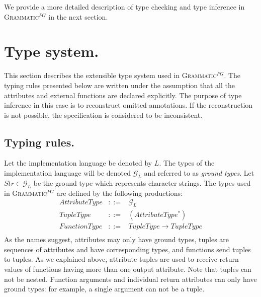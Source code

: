 \documentclass{informat} %
\newcommand{\ATF}{\textsc{Grammatic}$^{PG}$}
\begin{document}
We provide a more detailed description of type checking and type inference in \ATF{} in the next section.



\section{Type system.}\label{TypeSystem}

This section describes the extensible type system used in \ATF{}. The typing rules presented below are written under the assumption that all the attributes and external functions are declared explicitly. The purpose of type inference in this case is to reconstruct omitted annotations. If the reconstruction is not possible, the specification is considered to be inconsistent.

\subsection{Typing rules.}

\newcommand{\G}{ {\mathcal{G}_L} }
\renewcommand{\L}{L}
\newcommand{\eql}{\cong_\L}
\newcommand{\lel}{\le_\L}
\newcommand{\gel}{\ge_\L}
\newcommand{\TUP}{TupleType}
\newcommand{\Str}{String_\L}

Let the implementation language be denoted by $\L$. The types of the implementation language will be denoted $\G$ and referred to as \emph{ground types}. Let $Str \in \G$ be the ground type which represents character strings. The types used in \ATF{} are defined by the following productions:
$$
\begin{array}{rcl}
	AttributeType &::=& \G \\
	TupleType &::=& (AttributeType^*) \\
	FunctionType &::=& TupleType \rightarrow TupleType\\
\end{array}
$$
As the names suggest, attributes may only have ground types, tuples are sequences of attributes and have corresponding types, and functions send tuples to tuples. As we explained above, attribute tuples are used to receive return values of functions having more than one output attribute. Note that tuples can not be nested. Function arguments and individual return attributes can only have ground types: for example, a single argument can not be a tuple.
\end{document}
